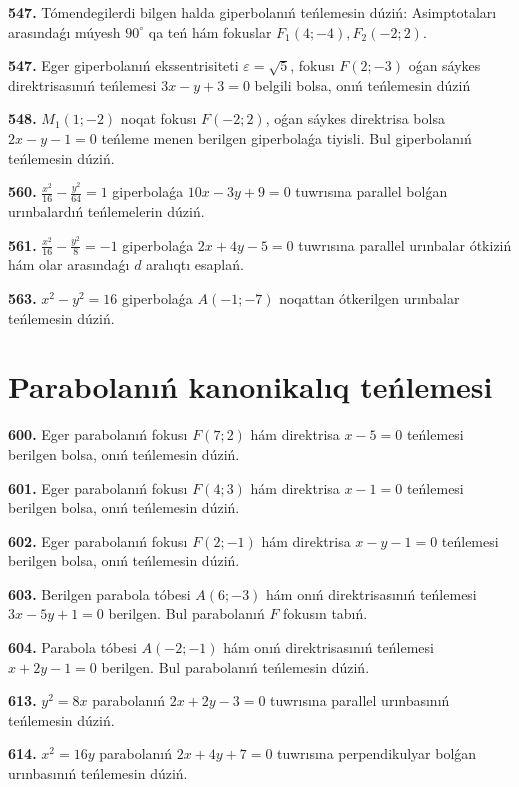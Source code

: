 \textbf{547.} Tómendegilerdi bilgen halda giperbolanıń teńlemesin dúziń: Asimptotaları arasındaǵı múyesh $90^{\circ}$ qa teń hám fokuslar $F_1 (4;-4), F_2 (-2; 2) $.

\textbf{547.} Eger giperbolanıń ekssentrisiteti $\varepsilon=\sqrt{5}$, fokusı $F (2;-3) $ oǵan sáykes direktrisasınıń teńlemesi $3 x-y+3=0$ belgili bolsa, onıń teńlemesin dúziń

\textbf{548.} $M_1 (1;-2) $ noqat fokusı $F (-2; 2) $, oǵan sáykes direktrisa bolsa $2x-y-1=0$ teńleme menen berilgen giperbolaǵa tiyisli. Bul giperbolanıń teńlemesin dúziń.

\textbf{560.} $\frac{x^2}{16}-\frac{y^2}{64}=1$ giperbolaǵa $10 x-3 y+9=0$ tuwrısına parallel bolǵan urınbalardıń teńlemelerin dúziń.

\textbf{561.} $\frac{x^2}{16}-\frac{y^2}{8}=-1$ giperbolaǵa $2 x+4 y-5=0$ tuwrısına parallel urınbalar ótkiziń hám olar arasındaǵı $d$ aralıqtı esaplań.

\textbf{563.} $x^2-y^2=16$ giperbolaǵa $A (-1;-7)$ noqattan ótkerilgen urınbalar teńlemesin dúziń.



\section{ Parabolanıń kanonikalıq teńlemesi}



\textbf{600.} Eger parabolanıń fokusı $F (7; 2) $ hám direktrisa $x-5=0$ teńlemesi berilgen bolsa, onıń teńlemesin dúziń.

\textbf{601.} Eger parabolanıń fokusı $F (4;3) $ hám direktrisa $x-1=0$ teńlemesi berilgen bolsa, onıń teńlemesin dúziń.

\textbf{602.} Eger parabolanıń fokusı $F(2;-1) $ hám direktrisa $x-y-1=0$ teńlemesi berilgen bolsa, onıń teńlemesin dúziń.

\textbf{603.} Berilgen parabola tóbesi $A (6;-3) $ hám onıń direktrisasınıń teńlemesi $3x-5y+1=0$ berilgen. Bul parabolanıń $F$ fokusın tabıń.

\textbf{604.} Parabola tóbesi $A (-2;-1) $ hám onıń direktrisasınıń teńlemesi $x+2y-1=0$ berilgen. Bul parabolanıń teńlemesin dúziń.

\textbf{613.} $y^2=8x$ parabolanıń $2x+2y-3=0$ tuwrısına parallel urınbasınıń teńlemesin dúziń.

\textbf{614.} $x^2=16y$ parabolanıń $2x+4y+7=0$ tuwrısına perpendikulyar bolǵan urınbasınıń teńlemesin dúziń.

